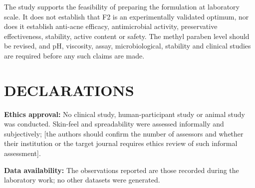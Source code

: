 \documentclass[10pt,a4paper,twocolumn]{article}
\begin{document}
The study supports the feasibility of preparing the formulation at
laboratory scale. It does not establish that F2 is an experimentally
validated optimum, nor does it establish anti-acne efficacy, antimicrobial
activity, preservative effectiveness, stability, active content or safety.
The methyl paraben level should be revised, and pH, viscosity, assay,
microbiological, stability and clinical studies are required before any
such claims are made.

\section*{DECLARATIONS}

\noindent\textbf{Ethics approval:} No clinical study, human-participant
study or animal study was conducted. Skin-feel and spreadability were
assessed informally and subjectively; [the authors should confirm the
number of assessors and whether their institution or the target journal
requires ethics review of such informal assessment].

\medskip
\noindent\textbf{Data availability:} The observations reported are those
recorded during the laboratory work; no other datasets were generated.



\end{document}
